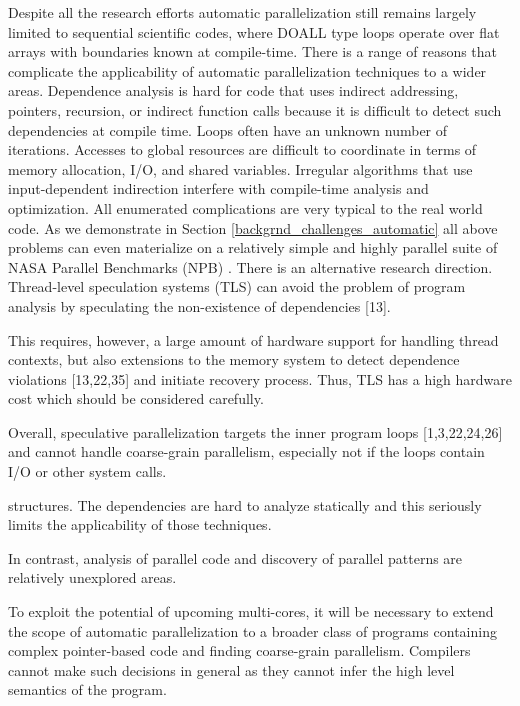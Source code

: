 \quad Despite all the research efforts automatic parallelization still remains largely limited to sequential scientific codes, where DOALL type loops operate over flat arrays with boundaries known at compile-time. There is a range of reasons that complicate the applicability of automatic parallelization techniques to a wider areas. Dependence analysis is hard for code that uses indirect addressing, pointers, recursion, or indirect function calls because it is difficult to detect such dependencies at compile time. Loops often have an unknown number of iterations. Accesses to global resources are difficult to coordinate in terms of memory allocation, I/O, and shared variables. Irregular algorithms that use input-dependent indirection interfere with compile-time analysis and optimization. All enumerated complications are very typical to the real world code. As we demonstrate in Section \ref{backgrnd_challenges_automatic} all above problems can even materialize on a relatively simple and highly parallel suite of NASA Parallel Benchmarks (NPB) \cite{nasa-parallel-benchmarks}.\newline\null
\quad There is an alternative research direction. Thread-level speculation systems (TLS) can avoid the problem of program analysis by speculating the non-existence of dependencies [13]. 

This requires, however, a large amount of hardware support for handling thread contexts, but also extensions to the memory system to detect dependence violations [13,22,35] and initiate recovery process. Thus, TLS has a high hardware cost which should be
considered carefully. 

Overall, speculative parallelization targets the inner program loops [1,3,22,24,26] and cannot handle coarse-grain parallelism, especially not if the loops contain I/O or other system calls. 

structures. The dependencies are hard to analyze statically and this seriously limits the applicability of those techniques.

In contrast, analysis of parallel code and discovery of parallel
patterns are relatively unexplored areas.

To exploit the potential of upcoming multi-cores, it will be necessary to extend the scope of automatic parallelization to a broader class of programs containing complex pointer-based code and finding coarse-grain parallelism. Compilers cannot make such decisions in general as they cannot infer the high level semantics of the program.

